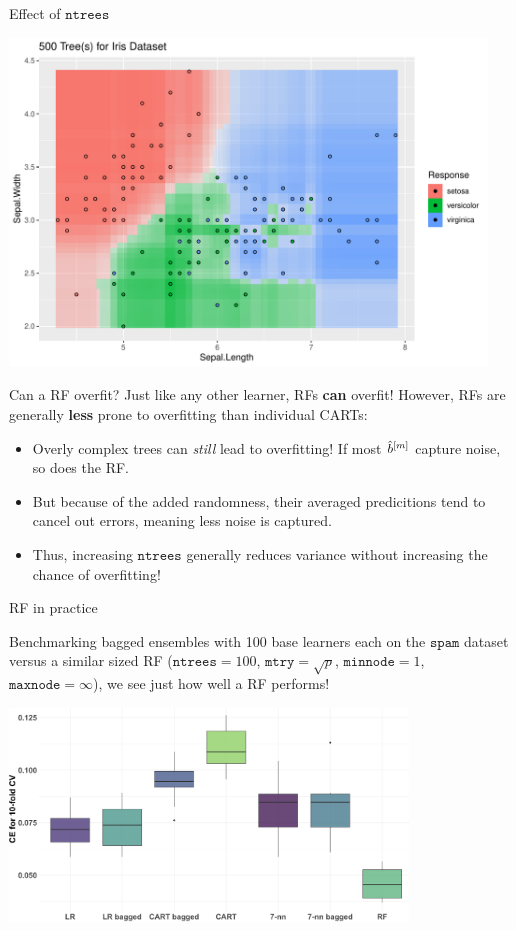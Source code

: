 \documentclass[11pt,compress,t,notes=noshow, xcolor=table]{beamer}
\begin{document}
\begin{vbframe}{Effect of $\texttt{ntrees}$}
\begin{knitrout}
{\centering \includegraphics[width=0.95\textwidth]{figure/cart_forest_intro_3} 

}
\end{knitrout}
\end{vbframe}

\begin{vbframe}{Can a RF overfit?}
Just like any other learner, RFs \textbf{can} overfit! However, RFs are generally \textbf{less} prone to overfitting than individual CARTs:
\begin{itemize}
  \item Overly complex trees can \textit{still} lead to overfitting! If most $\hat{b}^{[m]}$ capture noise, so does the RF.
  \item But because of the added randomness, their averaged predicitions tend to cancel out errors, meaning less noise is captured.
  \item Thus, increasing $\texttt{ntrees}$ generally reduces variance without increasing the chance of overfitting!
\end{itemize}
\end{vbframe}

\begin{vbframe}{RF in practice}

Benchmarking bagged ensembles with 100 base learners each on the $\texttt{spam}$ dataset versus a similar sized RF ($\texttt{ntrees} = 100$, $\texttt{mtry} = \sqrt{p}$, $\texttt{minnode} = 1$, $\texttt{maxnode} = \infty$), we see just how well a RF performs!

\begin{center}
\includegraphics[width=300pt]{figure/bagging-bench_RF.png}
\end{center}

\end{vbframe}

\endlecture
\end{document}
